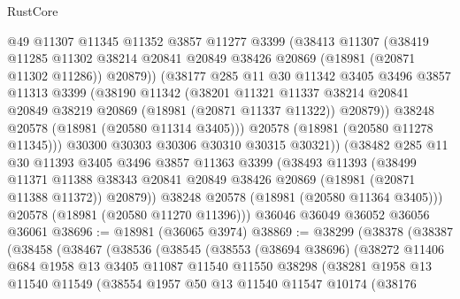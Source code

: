 \begin{lexlean}{RustCore}
\begin{coremodule}
            @49
            @11307
            @11345
            @11352
            @3857
            @11277
            @3399
            (@38413
              @11307
              (@38419
                @11285
                @11302
                @38214
                @20841
                @20849
                @38426
                @20869
                (@18981 (@20871 @11302 @11286))
                @20879))
            (@38177
              @285
              @11
              @30
              @11342
              @3405
              @3496
              @3857
              @11313
              @3399
              (@38190
                @11342
                (@38201
                  @11321
                  @11337
                  @38214
                  @20841
                  @20849
                  @38219
                  @20869
                  (@18981 (@20871 @11337 @11322))
                  @20879))
              @38248
              @20578
              (@18981 (@20580 @11314 @3405)))
            @20578
            (@18981 (@20580 @11278 @11345)))
          @30300
          @30303
          @30306
          @30310
          @30315
          @30321))
      (@38482
        @285
        @11
        @30
        @11393
        @3405
        @3496
        @3857
        @11363
        @3399
        (@38493
          @11393
          (@38499
            @11371
            @11388
            @38343
            @20841
            @20849
            @38426
            @20869
            (@18981 (@20871 @11388 @11372))
            @20879))
        @38248
        @20578
        (@18981 (@20580 @11364 @3405)))
      @20578
      (@18981 (@20580 @11270 @11396)))
    @36046
    @36049
    @36052
    @36056
    @36061
@38696 := @18981 (@36065 @3974)
@38869 := @38299
    (@38378
      (@38387
        (@38458
          (@38467
            (@38536
              (@38545
                (@38553
                  (@38694 @38696)
                  (@38272
                    @11406
                    @684
                    @1958
                    @13
                    @3405
                    @11087
                    @11540
                    @11550
                    @38298
                    (@38281
                      @1958
                      @13
                      @11540
                      @11549
                      (@38554
                        @1957
                        @50
                        @13
                        @11540
                        @11547
                        @10174
                        (@38176

\end{coremodule}
\end{lexlean}

